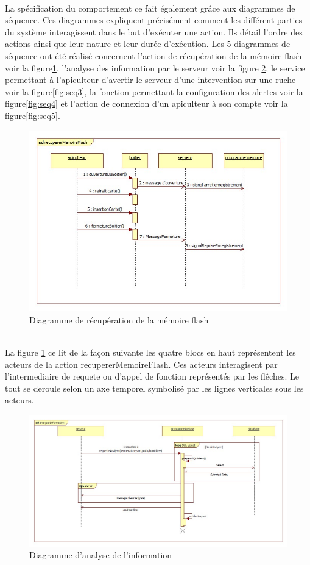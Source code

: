 \\La spécification du comportement ce fait également grâce aux diagrammes de séquence. Ces diagrammes expliquent précisément comment les différent parties du système interagissent dans le but d'exécuter une action. Ils détail l'ordre des actions ainsi que leur nature et leur durée d'exécution. Les 5 diagrammes de séquence ont été réalisé concernent l'action de récupération de la mémoire flash voir la figure\ref{fig:seq1}, l'analyse des information par le serveur voir la figure \ref{fig:seq2}, le service permettant à l'apiculteur d'avertir le serveur d'une intervention sur une ruche voir la figure\ref{fig:seq3}, la fonction permettant la configuration des alertes voir la figure\ref{fig:seq4} et l'action de connexion d'un apiculteur à son compte voir la figure\ref{fig:seq5}.
\begin{figure}[h!]
\centering\includegraphics[scale=0.7]{recupererMemoireFlash.jpg}
\caption{\label{fig:seq1} Diagramme de récupération de la mémoire flash}
\end{figure}
\\La figure \ref{fig:seq1} ce lit de la façon suivante les quatre blocs en haut représentent les acteurs de la action recupererMemoireFlash. Ces acteurs interagisent par l'intermediaire de requete ou d'appel de fonction représentés par les flêches. Le tout se deroule selon un axe temporel symbolisé par les lignes verticales sous les acteurs.
\begin{figure}[h!]
\centering\includegraphics[scale=0.4]{analyserInformation.jpg}
\caption{\label{fig:seq2} Diagramme d'analyse de l'information}
\end{figure}
